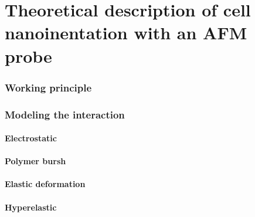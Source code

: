 \part{Theoretical description of cell nanoinentation with an AFM probe}

\section{Working principle}

\section{Modeling the interaction}

\subsection{Electrostatic}

\subsection{Polymer bursh}

\subsection{Elastic deformation}

\subsection{Hyperelastic}